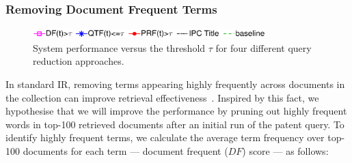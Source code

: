 \subsubsection{Removing Document Frequent Terms}
\label{SimpleApproaches}
\begin{figure}[t!]
\begin{centering}
\includegraphics[width=9cm]{figs/l3}
\par\end{centering}

\begin{centering}
 \hspace*{1.5cm} 
\par\end{centering} 

\protect\caption{System performance versus the threshold $\tau$ for four different query reduction approaches.}
\label{fig:combinedapproach}
\end{figure}
In standard IR, removing terms appearing highly frequently across documents in the collection can improve retrieval effectiveness~\citep{manning2008introduction}. Inspired by this fact, we hypothesise that we will improve the performance by pruning out highly frequent words in top-100 retrieved documents after an initial run of the patent query. To identify highly frequent terms, we calculate the average term frequency over top-100 documents for each term --- document frequent ($\mathit{DF}$) score --- as follows:
